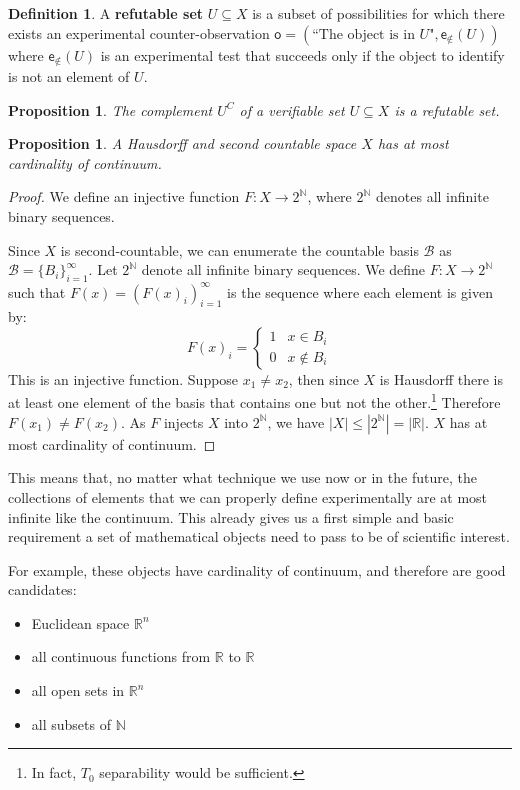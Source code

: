 \documentclass[review]{elsarticle}
\theoremstyle{plain}%
\newtheorem{prop}[thm]{Proposition}
\theoremstyle{definition}
\newtheorem{defn}{Definition}[section]
\theoremstyle{remark}
\begin{document}
\begin{defn}
	A \textbf{refutable set} $U \subseteq X$ is a subset of possibilities for which there exists an experimental counter-observation $\mathsf{o} = (\text{``The object is in } U \text{"}, \mathsf{e}_{\notin}(U))$ where $\mathsf{e}_{\notin}(U)$ is an experimental test that succeeds only if the object to identify is not an element of $U$.
\end{defn}

\begin{prop}
	The complement $U^C$ of a verifiable set $U \subseteq X$ is a refutable set.
\end{prop}


\begin{prop}
	A Hausdorff and second countable space $X$ has at most cardinality of continuum.
\end{prop}

\begin{proof}
	We define an injective function $F:X\to2^{\mathbb{N}}$, where $2^{\mathbb{N}}$ denotes all infinite binary sequences.
	
	Since $X$ is second-countable, we can enumerate the countable basis $\mathcal{B}$ as $\mathcal{B} = \{B_i\}_{i=1}^{\infty}$. Let $2^{\mathbb{N}}$ denote all infinite binary sequences. We define $F:X\to2^{\mathbb{N}}$ such that $F(x) = (F(x)_i)_{i=1}^{\infty}$ is the sequence where each element is given by: 
	$$
	F(x)_i = 
	\begin{cases}
	1 & x\in B_i \\
	0 & x\notin B_i
	\end{cases}
	$$
	This is an injective function. Suppose $x_1 \neq x_2$, then since $X$ is Hausdorff there is at least one element of the basis that contains one but not the other.\footnote{In fact, $T_0$ separability would be sufficient.} Therefore $F(x_1) \neq F(x_2)$. As $F$ injects $X$ into $2^{\mathbb{N}}$, we have $|X| \leq |2^{\mathbb{N}}|=|\mathbb{R}|$. $X$ has at most cardinality of continuum.
\end{proof}

This means that, no matter what technique we use now or in the future, the collections of elements that we can properly define experimentally are at most infinite like the continuum. This already gives us a first simple and basic requirement a set of mathematical objects need to pass to be of scientific interest.

For example, these objects have cardinality of continuum, and therefore are good candidates:
\begin{itemize}
	\item Euclidean space $\mathbb{R}^n$
	\item all continuous functions from $\mathbb{R}$ to $\mathbb{R}$
	\item all open sets in $\mathbb{R}^n$
	\item all subsets of $\mathbb{N}$
\end{itemize}
\end{document}
